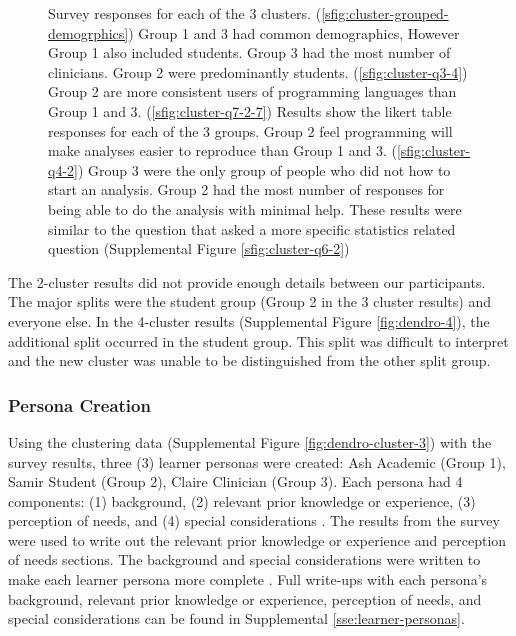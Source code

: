 \documentclass[020-persona\_validation.tex]{subfiles}
\begin{document}
\begin{figure}[!hbtp]
            {Survey responses for each of the 3 clusters.
                (\ref{sfig:cluster-grouped-demogrphics})
                Group 1 and 3 had common demographics, However Group 1 also included students.
                Group 3 had the most number of clinicians.
                Group 2 were predominantly students.
                (\ref{sfig:cluster-q3-4})
                Group 2 are more consistent users of programming languages than Group 1 and 3.
                (\ref{sfig:cluster-q7-2-7})
                Results show the likert table responses for each of the 3 groups.
                Group 2 feel programming will make analyses easier to reproduce than Group 1 and 3.
                (\ref{sfig:cluster-q4-2})
                Group 3 were the only group of people who did not how to start an analysis.
                Group 2 had the most number of responses for being able to do the analysis with minimal help.
                These results were similar to the question that asked a more specific statistics related question
                (Supplemental Figure \ref{sfig:cluster-q6-2})
            }
            \label{fig:cluster-results}
        \end{figure}

        The 2-cluster results did not provide enough details between our participants.
        The major splits were the student group (Group 2 in the 3 cluster results) and everyone else.
        In the 4-cluster results
        (Supplemental Figure \ref{fig:dendro-4}),
        the additional split occurred in the student group.
        This split was difficult to interpret and the new cluster was unable to be distinguished from the other split group.

    \subsubsection{Persona Creation}

        Using the clustering data (Supplemental Figure \ref{fig:dendro-cluster-3})
        with the survey results, three (3) learner personas were created:
        Ash Academic (Group 1), Samir Student (Group 2), Claire Clinician (Group 3).
        Each persona had 4 components: (1) background, (2) relevant prior knowledge or experience,
        (3) perception of needs, and (4) special considerations
        \cite{rstudioLearnerPersonas2019, softwarecarpentryLearnerProfiles, wilson2019teaching}.
        The results from the survey were used to write out the
        relevant prior knowledge or experience and perception of needs sections.
        The background and special considerations were written to make each learner persona more complete
        \cite{pruittPersonaLifecycleKeeping2006}.
        Full write-ups with each persona's
        background, relevant prior knowledge or experience, perception of needs, and special considerations
        can be found in Supplemental \ref{sse:learner-personas}.
\end{document}
